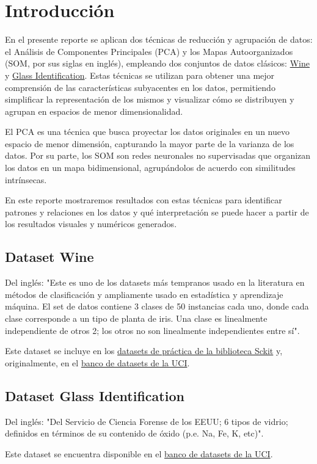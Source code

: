 \section[Introducción]{Introducción}
En el presente reporte se aplican dos técnicas de reducción y agrupación de datos: el Análisis de Componentes Principales (PCA) y los Mapas Autoorganizados (SOM, por sus siglas en inglés), empleando dos conjuntos de datos clásicos: \href{https://scikit-learn.org/stable/modules/generated/sklearn.datasets.load_wine.html#sklearn.datasets.load_wine}{Wine} y \href{https://archive.ics.uci.edu/dataset/42/glass+identification}{Glass Identification}. Estas técnicas se utilizan para obtener una mejor comprensión de las características subyacentes en los datos, permitiendo simplificar la representación de los mismos y visualizar cómo se distribuyen y agrupan en espacios de menor dimensionalidad.

El PCA es una técnica que busca proyectar los datos originales en un nuevo espacio de menor dimensión, capturando la mayor parte de la varianza de los datos. Por su parte, los SOM son redes neuronales no supervisadas que organizan los datos en un mapa bidimensional, agrupándolos de acuerdo con similitudes intrínsecas.

En este reporte mostraremos resultados con estas técnicas para identificar patrones y relaciones en los datos y qué interpretación se puede hacer a partir de los resultados visuales y numéricos generados.

\subsection[Wine]{Dataset Wine}
Del inglés: "Este es uno de los datasets más tempranos usado en la literatura en métodos de clasificación y ampliamente usado en estadística y aprendizaje máquina. El set de datos contiene 3 clases de 50 instancias cada uno, donde cada clase corresponde a un tipo de planta de iris. Una clase es linealmente independiente de otros 2; los otros no son linealmente independientes entre sí".

Este dataset se incluye en los \href{https://scikit-learn.org/stable/datasets/toy_dataset.html}{datasets de práctica de la biblioteca Sckit} y, originalmente, en el \href{https://archive.ics.uci.edu/dataset/53/iris}{banco de datasets de la UCI}.

\subsection[short]{Dataset Glass Identification}
Del inglés: "Del Servicio de Ciencia Forense de los EEUU; 6 tipos de vidrio; definidos en términos de su contenido de óxido (p.e. Na, Fe, K, etc)".

Este dataset se encuentra disponible en el \href{https://archive.ics.uci.edu/dataset/42/glass+identification}{banco de datasets de la UCI}.